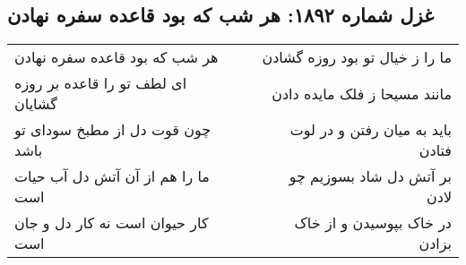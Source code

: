 \begin{center}
\section*{غزل شماره ۱۸۹۲: هر شب که بود قاعده سفره نهادن}
\label{sec:1892}
\begin{longtable}{l p{0.5cm} r}
هر شب که بود قاعده سفره نهادن
&&
ما را ز خیال تو بود روزه گشادن
\\
ای لطف تو را قاعده بر روزه گشایان
&&
مانند مسیحا ز فلک مایده دادن
\\
چون قوت دل از مطبخ سودای تو باشد
&&
باید به میان رفتن و در لوت فتادن
\\
ما را هم از آن آتش دل آب حیات است
&&
بر آتش دل شاد بسوزیم چو لادن
\\
کار حیوان است نه کار دل و جان است
&&
در خاک بپوسیدن و از خاک بزادن
\\
\end{longtable}
\end{center}
